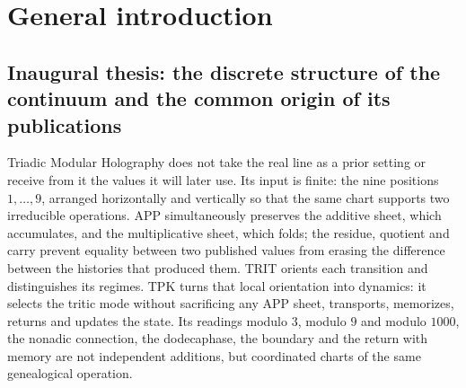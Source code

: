 \chapter*{General introduction}
\label{chap:introduccion-general-83}

%
%

\ifdefined\HMTSucesoraStructureTrace
\fi

\section*{Inaugural thesis: the discrete structure of the continuum and the common origin of its publications}
\label{sec:tesis-inaugural-helicoidal-hmt-md}

Triadic Modular Holography does not take the real line as a prior setting or
receive from it the values it will later use. Its input is finite: the
nine positions \(1,\ldots,9\), arranged horizontally and vertically so
that the same chart supports two irreducible operations. APP simultaneously preserves
the additive sheet, which accumulates, and the multiplicative sheet, which folds; the
residue, quotient and carry prevent equality between two published
values from erasing the difference between the histories that produced them. TRIT
orients each transition and distinguishes its regimes. TPK turns that
local orientation into dynamics: it selects the tritic mode without sacrificing
any APP sheet, transports, memorizes, returns and updates the state. Its
readings modulo \(3\), modulo \(9\) and modulo \(1000\), the nonadic connection,
the dodecaphase, the boundary and the return with memory are not independent
additions, but coordinated charts of the same genealogical operation.

